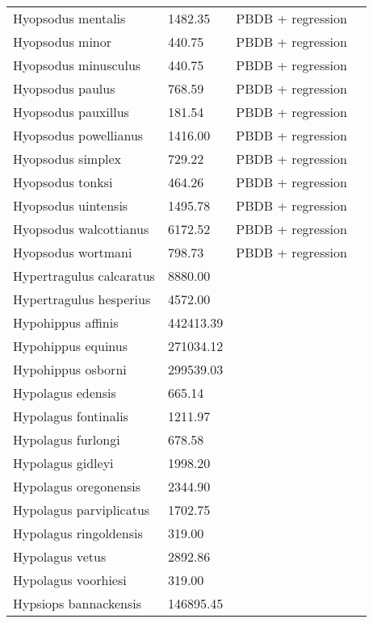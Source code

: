 \documentclass{article}
\begin{document}
\begin{center}
\begin{longtable}{p{} p{} p{} p{}}
    Hyopsodus mentalis & 1482.35 & PBDB + regression &  \\ 
    Hyopsodus minor & 440.75 & PBDB + regression &  \\ 
    Hyopsodus minusculus & 440.75 & PBDB + regression &  \\ 
    Hyopsodus paulus & 768.59 & PBDB + regression &  \\ 
    Hyopsodus pauxillus & 181.54 & PBDB + regression &  \\ 
    Hyopsodus powellianus & 1416.00 & PBDB + regression &  \\ 
    Hyopsodus simplex & 729.22 & PBDB + regression &  \\ 
    Hyopsodus tonksi & 464.26 & PBDB + regression &  \\ 
    Hyopsodus uintensis & 1495.78 & PBDB + regression &  \\ 
    Hyopsodus walcottianus & 6172.52 & PBDB + regression &  \\ 
    Hyopsodus wortmani & 798.73 & PBDB + regression &  \\ 
    Hypertragulus calcaratus & 8880.00 & \cite{McKenna2011} &  \\ 
    Hypertragulus hesperius & 4572.00 & \cite{McKenna2011} &  \\ 
    Hypohippus affinis & 442413.39 & \cite{Tomiya2013} &  \\ 
    Hypohippus equinus & 271034.12 & \cite{Tomiya2013} &  \\ 
    Hypohippus osborni & 299539.03 & \cite{Tomiya2013} &  \\ 
    Hypolagus edensis & 665.14 & \cite{Tomiya2013} &  \\ 
    Hypolagus fontinalis & 1211.97 & \cite{Tomiya2013} &  \\ 
    Hypolagus furlongi & 678.58 & \cite{Tomiya2013} &  \\ 
    Hypolagus gidleyi & 1998.20 & \cite{Tomiya2013} &  \\ 
    Hypolagus oregonensis & 2344.90 & \cite{Tomiya2013} &  \\ 
    Hypolagus parviplicatus & 1702.75 & \cite{Tomiya2013} &  \\ 
    Hypolagus ringoldensis & 319.00 & \cite{McKenna2011} &  \\ 
    Hypolagus vetus & 2892.86 & \cite{Tomiya2013} &  \\ 
    Hypolagus voorhiesi & 319.00 & \cite{McKenna2011} &  \\ 
    Hypsiops bannackensis & 146895.45 & \cite{Wang1999} &  \\ 

\end{longtable}
\end{center}
\end{document}
